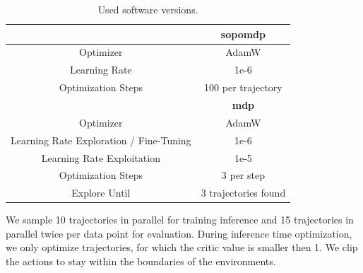 \begin{table}[H]
    \centering
    \begin{tabular}{|c|c|}
    \hline
    {} & \textbf{\ac{sopomdp}} \\
    \hline\hline
    Optimizer & AdamW \\
    \hline
    Learning Rate & 1e-6 \\
    \hline
    Optimization Steps & 100 per trajectory\\
    \hline\hline
    {} & \textbf{\ac{mdp}}  \\
    \hline\hline
    Optimizer & AdamW \\
    \hline
    Learning Rate Exploration / Fine-Tuning & 1e-6 \\
    \hline
    Learning Rate Exploitation & 1e-5 \\
    \hline
    Optimization Steps & 3 per step\\
    \hline
    Explore Until & 3 trajectories found\\
    \hline
    \end{tabular}
    \caption{Used software versions.}
    \label{tab:inference_parameters}
\end{table}

We sample 10 trajectories in parallel for training inference and 15 trajectories in parallel twice per data point for evaluation. During inference time 
optimization, we only optimize trajectories, for which the critic value is smaller then 1. We clip the actions to stay within the boundaries of the environments.\\


